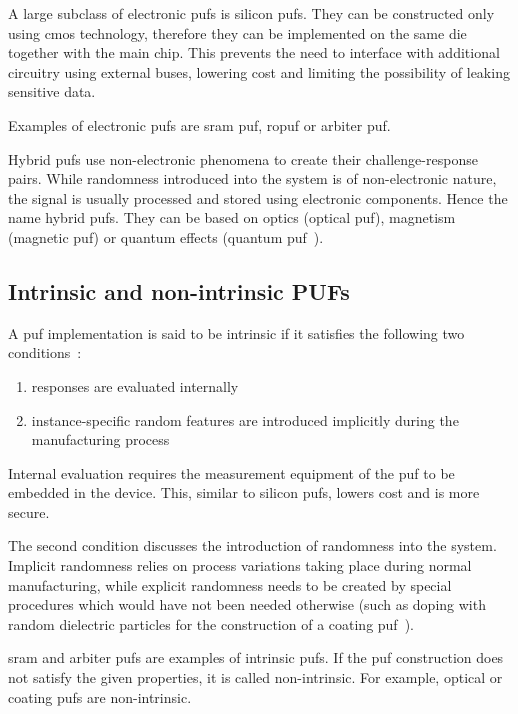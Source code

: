 A large subclass of electronic \glspl{puf} is silicon \glspl{puf}. They can be constructed only using \gls{cmos} technology, therefore they can be implemented on the same die together with the main chip. This prevents the need to interface with additional circuitry using external buses, lowering cost and limiting the possibility of leaking sensitive data.~\cite{Maes2013}

Examples of electronic \glspl{puf} are \gls{sram} \gls{puf}, \gls{ropuf} or arbiter \gls{puf}.

Hybrid \glspl{puf} use non-electronic phenomena to create their challenge-response pairs. While randomness introduced into the system is of non-electronic nature, the signal is usually processed and stored using electronic components. Hence the name hybrid \glspl{puf}. They can be based on optics (optical \gls{puf}), magnetism (magnetic \gls{puf}) or quantum effects (quantum \gls{puf}~\cite{Koustubh2021}).


\subsection{Intrinsic and non-intrinsic PUFs}\label{sec:intrinsic_nonintrinsic}

A \gls{puf} implementation is said to be intrinsic if it satisfies the following two conditions~\cite{Maes2010}:

\begin{enumerate}
    \item responses are evaluated internally
    \item instance-specific random features are introduced implicitly during the manufacturing process
\end{enumerate}

Internal evaluation requires the measurement equipment of the \gls{puf} to be embedded in the device. This, similar to silicon \glspl{puf}, lowers cost and is more secure.

The second condition discusses the introduction of randomness into the system. Implicit randomness relies on process variations taking place during normal manufacturing, while explicit randomness needs to be created by special procedures which would have not been needed otherwise (such as doping with random dielectric particles for the construction of a coating \gls{puf}~\cite{Kori2006}).

\gls{sram} and arbiter \glspl{puf} are examples of intrinsic \glspl{puf}. If the \gls{puf} construction does not satisfy the given properties, it is called non-intrinsic. For example, optical or coating \glspl{puf} are non-intrinsic.~\cite{Maes2012}

